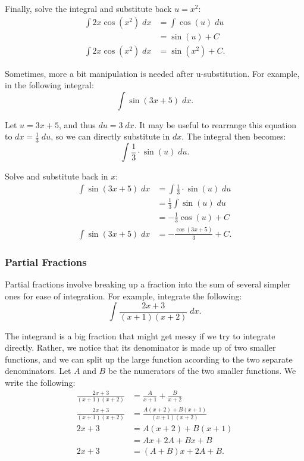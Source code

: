 \noindent Finally, solve the integral and substitute back $u = x^2$:
\begin{align*}
	\int 2x \cos(x^2) \; dx &= \int \cos(u) \; du \\[5pt]
	&= \sin(u) + C \\[5pt]
	\int 2x \cos(x^2) \; dx &= \sin(x^2) + C.
\end{align*}

Sometimes, more a bit manipulation is needed after u-substitution. For example, in the following integral:
\[ \int \sin(3x + 5) \; dx. \]

\noindent Let $u = 3x + 5$, and thus $du = 3 \; dx$. It may be useful to rearrange this equation to $dx = \frac{1}{3} \; du$, so we can directly substitute in $dx$. The integral then becomes:
\[ \int \frac{1}{3} \cdot \sin(u) \; du. \]

\noindent Solve and substitute back in $x$:
\begin{align*}
	\int \sin(3x + 5) \; dx &= \int \frac{1}{3} \cdot \sin(u) \; du \\[5pt]
	&= \frac{1}{3} \int \sin(u) \; du \\[5pt]
	&= -\frac{1}{3} \cos(u) + C \\[5pt]
	\int \sin(3x + 5) \; dx &= -\frac{\cos(3x + 5)}{3} + C.
\end{align*}

\subsubsection{Partial Fractions}
Partial fractions involve breaking up a fraction into the sum of several simpler ones for ease of integration. For example, integrate the following:
\[ \int \frac{2x + 3}{(x + 1)(x + 2)} \; dx. \]

The integrand is a big fraction that might get messy if we try to integrate directly. Rather, we notice that its denominator is made up of two smaller functions, and we can split up the large function according to the two separate denominators. Let $A$ and $B$ be the numerators of the two smaller functions. We write the following:
\begin{align*}
	\frac{2x + 3}{(x + 1)(x + 2)} &= \frac{A}{x + 1} + \frac{B}{x + 2} \\[5pt]
	\frac{2x + 3}{(x + 1)(x + 2)} &= \frac{A(x + 2) + B(x + 1)}{(x + 1)(x + 2)} \\[5pt]
	2x + 3 &= A(x + 2) + B(x + 1) \\
	&= Ax + 2A + Bx + B \\
	2x + 3 &= (A + B)x + 2A + B.
\end{align*}

